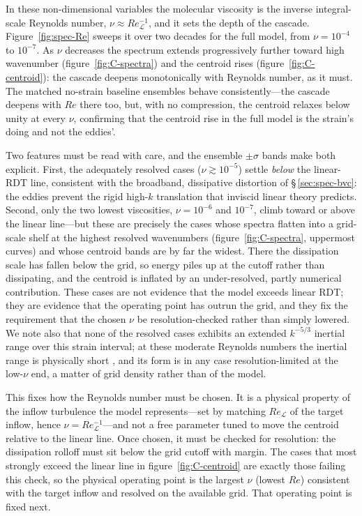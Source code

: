 \documentclass[lineno]{JFM-FLM_Au}
\begin{document}
In these non-dimensional variables the molecular viscosity is the inverse
integral-scale Reynolds number, $\nu\approx Re_{\mathcal{L}}^{-1}$, and it sets
the depth of the cascade. Figure~\ref{fig:spec-Re} sweeps it over two decades
for the full model, from $\nu=10^{-4}$ to $10^{-7}$. As $\nu$ decreases the
spectrum extends progressively further toward high wavenumber
(figure~\ref{fig:C-spectra}) and the centroid rises
(figure~\ref{fig:C-centroid}): the cascade deepens monotonically with Reynolds
number, as it must. The matched no-strain baseline ensembles behave
consistently---the cascade deepens with $Re$ there too, but, with no
compression, the centroid relaxes below unity at every $\nu$, confirming that
the centroid rise in the full model is the strain's doing and not the eddies'.

Two features must be read with care, and the ensemble $\pm\sigma$ bands make
both explicit. First, the adequately resolved cases ($\nu\gtrsim10^{-5}$)
settle \emph{below} the linear-RDT line, consistent with the broadband,
dissipative distortion of \S\,\ref{sec:spec-bvc}: the eddies prevent the rigid
high-$k$ translation that inviscid linear theory predicts. Second, only the two
lowest viscosities, $\nu=10^{-6}$ and $10^{-7}$, climb toward or above the
linear line---but these are precisely the cases whose spectra flatten into a
grid-scale shelf at the highest resolved wavenumbers (figure~\ref{fig:C-spectra},
uppermost curves) and whose centroid bands are by far the widest. There the
dissipation scale has fallen below the grid, so energy piles up at the cutoff
rather than dissipating, and the centroid is inflated by an under-resolved,
partly numerical contribution. These cases are not evidence that the model
exceeds linear RDT; they are evidence that the operating point has outrun the
grid, and they fix the requirement that the chosen $\nu$ be resolution-checked
rather than simply lowered. We note also that none of the resolved cases
exhibits an extended $k^{-5/3}$ inertial range \citep{Kolmogorov1991} over this
strain interval; at these moderate Reynolds numbers the inertial range is
physically short \citep{Pope2000}, and its form is in any case resolution-limited
at the low-$\nu$ end, a matter of grid density rather than of the model.

This fixes how the Reynolds number must be chosen. It is a physical property of
the inflow turbulence the model represents---set by matching $Re_{\mathcal{L}}$
of the target inflow, hence $\nu=Re_{\mathcal{L}}^{-1}$---and not a free
parameter tuned to move the centroid relative to the linear line. Once chosen,
it must be checked for resolution: the dissipation rolloff must sit below the
grid cutoff with margin. The cases that most strongly exceed the linear line in
figure~\ref{fig:C-centroid} are exactly those failing this check, so the
physical operating point is the largest $\nu$ (lowest $Re$) consistent with the
target inflow and resolved on the available grid. That operating point is fixed
next.
\end{document}
